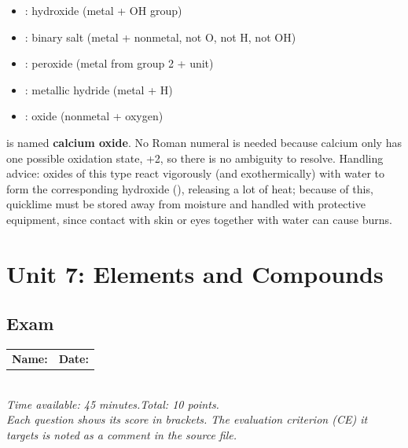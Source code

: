 \documentclass[11pt,a4paper]{article}
\newcommand{\examheader}[1]{%
\begin{center}
\begin{tabular}{ll}
\textbf{Name:} \makebox[6cm]{\dotfill} & \textbf{Date:} \makebox[3cm]{\dotfill} \\
\end{tabular}\\[4pt]
\textit{Time available: 45 minutes.\quad Total: 10 points.}\\[2pt]
\textit{Each question shows its score in brackets. The evaluation criterion (CE) it targets is noted as a comment in the source file.}
\end{center}
}
\begin{document}
\begin{solucioneng}
\begin{itemize}
    \item {}: hydroxide (metal + OH group)
    \item {}: binary salt (metal + nonmetal, not O, not H, not OH)
    \item {}: peroxide (metal from group 2 +  unit)
    \item {}: metallic hydride (metal + H)
    \item {}: oxide (nonmetal + oxygen)
\end{itemize}
\end{solucioneng}

\begin{solucioneng}
 is named \textbf{calcium oxide}. No Roman numeral is needed because calcium only has one possible oxidation state, +2, so there is no ambiguity to resolve. Handling advice: oxides of this type react vigorously (and exothermically) with water to form the corresponding hydroxide (), releasing a lot of heat; because of this, quicklime must be stored away from moisture and handled with protective equipment, since contact with skin or eyes together with water can cause burns.
\end{solucioneng}

\newpage
\section{Unit 7: Elements and Compounds}
\subsection*{Exam}
\examheader{Unit 7}
\setcounter{preg}{1}



\end{document}
